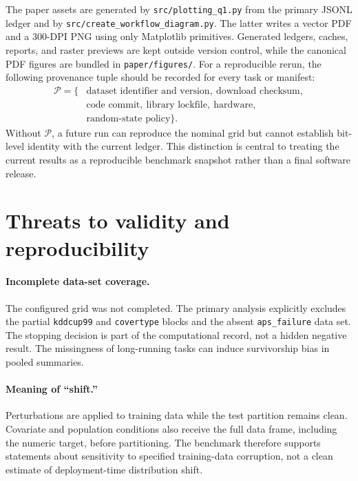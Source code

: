 \documentclass[preprint,12pt]{elsarticle}
\begin{document}
The paper assets are generated by \texttt{src/plotting\_q1.py} from the primary JSONL ledger and by \texttt{src/create\_workflow\_diagram.py}.  The latter writes a vector PDF and a 300-DPI PNG using only Matplotlib primitives.  Generated ledgers, caches, reports, and raster previews are kept outside version control, while the canonical PDF figures are bundled in \texttt{paper/figures/}.  For a reproducible rerun, the following provenance tuple should be recorded for every task or manifest:
\begin{equation}
\begin{aligned}
  \mathcal{P}=\{&\text{dataset identifier and version},\ \text{download checksum},\\
  &\text{code commit},\ \text{library lockfile},\ \text{hardware},\\
  &\text{random-state policy}\}.
\end{aligned}
\end{equation}
Without $\mathcal{P}$, a future run can reproduce the nominal grid but cannot establish bit-level identity with the current ledger.  This distinction is central to treating the current results as a reproducible benchmark snapshot rather than a final software release.

\section{Threats to validity and reproducibility}
\label{sec:limitations}

\paragraph{Incomplete data-set coverage.} The configured grid was not completed.  The primary analysis explicitly excludes the partial \texttt{kddcup99} and \texttt{covertype} blocks and the absent \texttt{aps\_failure} data set.  The stopping decision is part of the computational record, not a hidden negative result.  The missingness of long-running tasks can induce survivorship bias in pooled summaries.

\paragraph{Meaning of ``shift.''} Perturbations are applied to training data while the test partition remains clean.  Covariate and population conditions also receive the full data frame, including the numeric target, before partitioning.  The benchmark therefore supports statements about sensitivity to specified training-data corruption, not a clean estimate of deployment-time distribution shift.
\end{document}

